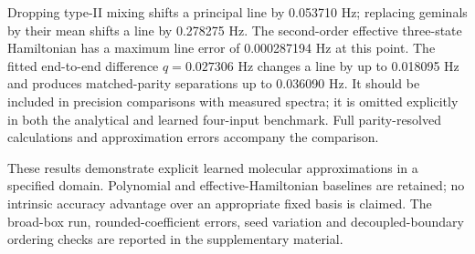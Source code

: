 Dropping type-II mixing shifts a principal line by 0.053710 Hz; replacing
geminals by their mean shifts a line by 0.278275 Hz. The second-order effective
three-state Hamiltonian has a maximum line error of 0.000287194 Hz at this point.
The fitted end-to-end difference $q=0.027306$ Hz changes a line by up to
0.018095 Hz and produces matched-parity separations up to 0.036090 Hz.
It should be included in precision comparisons with measured spectra; it is
omitted explicitly in both the analytical and learned four-input benchmark.
Full parity-resolved calculations and approximation errors accompany the comparison.

These results demonstrate explicit learned molecular approximations in a
specified domain. Polynomial and effective-Hamiltonian baselines are retained;
no intrinsic accuracy advantage over an appropriate fixed basis is claimed.
The broad-box run, rounded-coefficient errors, seed variation and decoupled-boundary
ordering checks are reported in the supplementary material.
